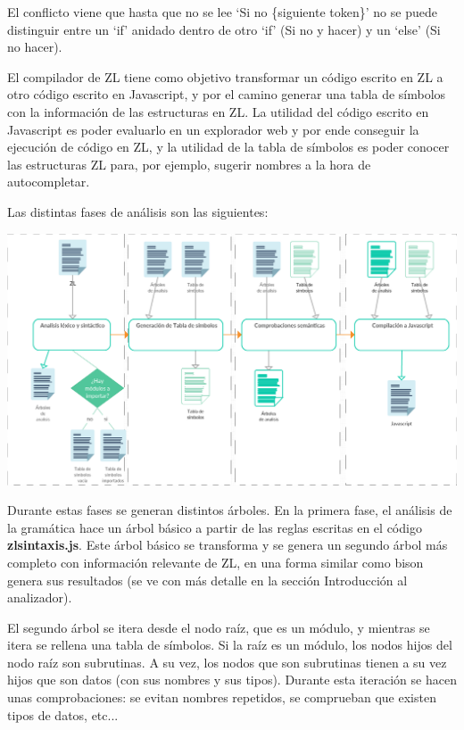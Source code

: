 \documentclass{report}
\begin{document}
	El conflicto\cite{conflictoll3} viene que hasta que no se lee `Si no \{siguiente token\}' no se puede distinguir entre un `if' anidado dentro de otro `if' (Si no y hacer) y un `else' (Si no hacer).
	
	El compilador de ZL tiene como objetivo transformar un código escrito en ZL a otro código escrito en Javascript, y por el camino generar una tabla de símbolos con la información de las estructuras en ZL. La utilidad del código escrito en Javascript es poder evaluarlo en un explorador web y por ende conseguir la ejecución de código en ZL, y la utilidad de la tabla de símbolos es poder conocer las estructuras ZL para, por ejemplo, sugerir nombres a la hora de autocompletar. 
	
	\vspace{10px}
	
	Las distintas fases de análisis son las siguientes:
	
	\begin{center}
	\includegraphics[width=1\linewidth]{fasesanalisis}
	\end{center}
	
		
	Durante estas fases se generan distintos árboles. En la primera fase, el análisis de la gramática hace un árbol básico a partir de las reglas escritas en el código \textbf{zlsintaxis.js}. Este árbol básico se transforma y se genera un segundo árbol más completo con información relevante de ZL, en una forma similar como bison genera sus resultados (se ve con más detalle en la sección Introducción al analizador).
	
	\vspace{10px}
	
	El segundo árbol se itera desde el nodo raíz, que es un módulo, y mientras se itera se rellena una tabla de símbolos. Si la raíz es un módulo, los nodos hijos del nodo raíz son subrutinas. A su vez, los nodos que son subrutinas tienen a su vez hijos que son datos (con sus nombres y sus tipos). Durante esta iteración se hacen unas comprobaciones: se evitan nombres repetidos, se comprueban que existen tipos de datos, etc...
	
\end{document}
